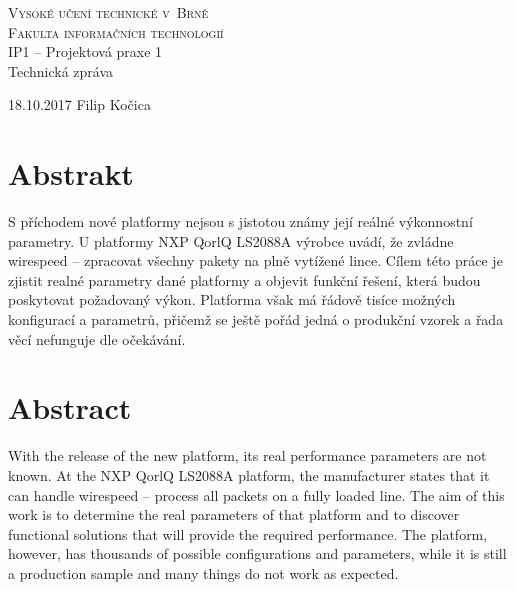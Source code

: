 \documentclass[11pt, titlepage, a4paper]{article}
\begin{document}
		\begin{titlepage}
		\begin{center}
		\textsc{\Huge{Vysoké učení technické v~Brně\\}
		\huge{Fakulta informačních technologií\\}}
		\LARGE{IP1 -- Projektová praxe 1\\}
		\Huge{Technická zpráva\\}
		\end{center}
		\Large{18.10.2017 \hfill Filip Kočica}
		\end{titlepage}


		\newpage
		\section*{Abstrakt}

		S příchodem nové platformy nejsou s jistotou známy její reálné výkonnostní parametry.
		U platformy NXP QorlQ LS2088A výrobce uvádí, že zvládne wirespeed -- zpracovat všechny pakety na plně vytížené lince.
		Cílem této práce je zjistit realné parametry dané platformy a objevit funkční řešení, která budou poskytovat požadovaný výkon.
		Platforma však má řádově tisíce možných konfigurací a parametrů, přičemž se ještě pořád jedná o produkční vzorek a řada věcí nefunguje
		dle očekávání.

		\medskip

		\section*{Abstract}
		
		With the release of the new platform, its real performance parameters are not known.
		At the NXP QorlQ LS2088A platform, the manufacturer states that it can handle wirespeed -- process all packets on a fully loaded line.
		The aim of this work is to determine the real parameters of that platform and to discover functional solutions that will provide the required performance.
		The platform, however, has thousands of possible configurations and parameters, while it is still a production sample and many things do not work
		as expected.

		\newpage
\end{document}
